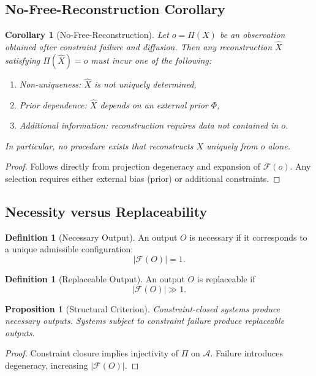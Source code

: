 \documentclass[12pt, oneside]{article}
\theoremstyle{plain}
\newtheorem{proposition}[theorem]{Proposition}
\newtheorem{corollary}[theorem]{Corollary}
\theoremstyle{definition}
\newtheorem{definition}[theorem]{Definition}
\theoremstyle{remark}
\begin{document}
\subsection{No-Free-Reconstruction Corollary}

\begin{corollary}[No-Free-Reconstruction]
Let $o = \Pi(X)$ be an observation obtained after constraint failure and diffusion. Then any reconstruction $\hat{X}$ satisfying $\Pi(\hat{X}) = o$ must incur one of the following:

\begin{enumerate}
\item Non-uniqueness: $\hat{X}$ is not uniquely determined,
\item Prior dependence: $\hat{X}$ depends on an external prior $\Phi$,
\item Additional information: reconstruction requires data not contained in $o$.
\end{enumerate}

In particular, no procedure exists that reconstructs $X$ uniquely from $o$ alone.
\end{corollary}

\begin{proof}
Follows directly from projection degeneracy and expansion of $\mathcal{F}(o)$. Any selection requires either external bias (prior) or additional constraints.
\end{proof}

\subsection{Necessity versus Replaceability}

\begin{definition}[Necessary Output]
An output $O$ is necessary if it corresponds to a unique admissible configuration:
\[
|\mathcal{F}(O)| = 1.
\]
\end{definition}

\begin{definition}[Replaceable Output]
An output $O$ is replaceable if
\[
|\mathcal{F}(O)| \gg 1.
\]
\end{definition}

\begin{proposition}[Structural Criterion]
Constraint-closed systems produce necessary outputs. Systems subject to constraint failure produce replaceable outputs.
\end{proposition}

\begin{proof}
Constraint closure implies injectivity of $\Pi$ on $\mathcal{A}$. Failure introduces degeneracy, increasing $|\mathcal{F}(O)|$.
\end{proof}
\end{document}
